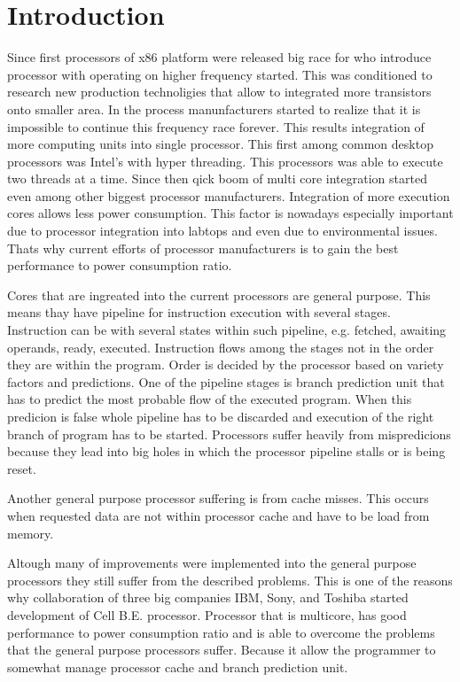\chapter{Introduction}

Since first processors of x86 platform were released big race for who introduce processor with operating on higher frequency started.
This was conditioned to research new production technoligies that allow to integrated more transistors onto smaller area.
In the process manunfacturers started to realize that it is impossible to continue this frequency race forever.
This results integration of more computing units into single processor.
This first among common desktop processors was Intel's  with hyper threading.
This processors was able to execute two threads at a time.
Since then qick boom of multi core integration started even among other biggest processor manufacturers.
Integration of more execution cores allows less power consumption.
This factor is nowadays especially important due to processor integration into labtops and even due to environmental issues.
Thats why current efforts of processor manufacturers is to gain the best performance to power consumption ratio.

Cores that are ingreated into the current processors are general purpose.
This means thay have pipeline for instruction execution with several stages.
Instruction can be with several states within such pipeline, e.g. fetched, awaiting operands, ready, executed.
Instruction flows among the stages not in the order they are within the program.
Order is decided by the processor based on variety factors and predictions.
One of the pipeline stages is branch prediction unit that has to predict the most probable flow of the executed program.
When this predicion is false whole pipeline has to be discarded and execution of the right branch of program has to be started.
Processors suffer heavily from mispredicions because they lead into big holes in which the processor pipeline stalls or is being reset.

Another general purpose processor suffering is from cache misses.
This occurs when requested data are not within processor cache and have to be load from memory.

Altough many of improvements were implemented into the general purpose processors they still suffer from the described problems.
This is one of the reasons why collaboration of three big companies IBM, Sony, and Toshiba started development of Cell B.E. processor.
Processor that is multicore, has good performance to power consumption ratio and is able to overcome the problems that the general purpose processors suffer.
Because it allow the programmer to somewhat manage processor cache and branch prediction unit.

